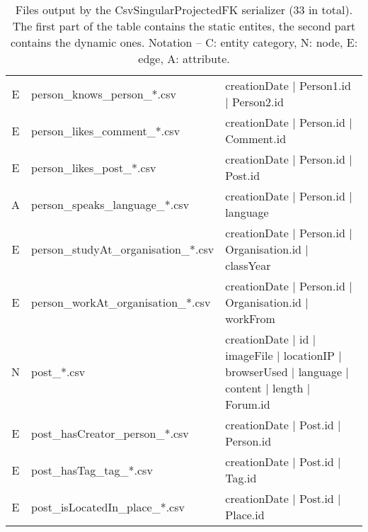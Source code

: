 \begin{table}[htb]
\begin{tabular}{|c|l|l|}
        E                    & person\_knows\_person\_*.csv            & creationDate | Person1.id | Person2.id                                                            \\
        E                    & person\_likes\_comment\_*.csv           & creationDate | Person.id | Comment.id                                                             \\
        E                    & person\_likes\_post\_*.csv              & creationDate | Person.id | Post.id                                                                \\
        A                    & person\_speaks\_language\_*.csv         & creationDate | Person.id | language                                                               \\
        E                    & person\_studyAt\_organisation\_*.csv    & creationDate | Person.id | Organisation.id | classYear                                            \\
        E                    & person\_workAt\_organisation\_*.csv     & creationDate | Person.id | Organisation.id | workFrom                                             \\
        \hline
        N                    & post\_*.csv                             & creationDate | id | imageFile | locationIP | browserUsed | language | content | length | Forum.id \\
        E                    & post\_hasCreator\_person\_*.csv         & creationDate | Post.id | Person.id                                                                \\
        E                    & post\_hasTag\_tag\_*.csv                & creationDate | Post.id | Tag.id                                                                   \\
        E                    & post\_isLocatedIn\_place\_*.csv         & creationDate | Post.id | Place.id                                                                 \\
        \hline
    \end{tabular}
    \caption{Files output by the CsvSingularProjectedFK serializer (33 in total). The first part of the table contains the static entites, the second part contains the dynamic ones. Notation -- C: entity category, N: node, E: edge, A: attribute.}
    \label{table:csv-singular-projectedfk}
\end{table}
